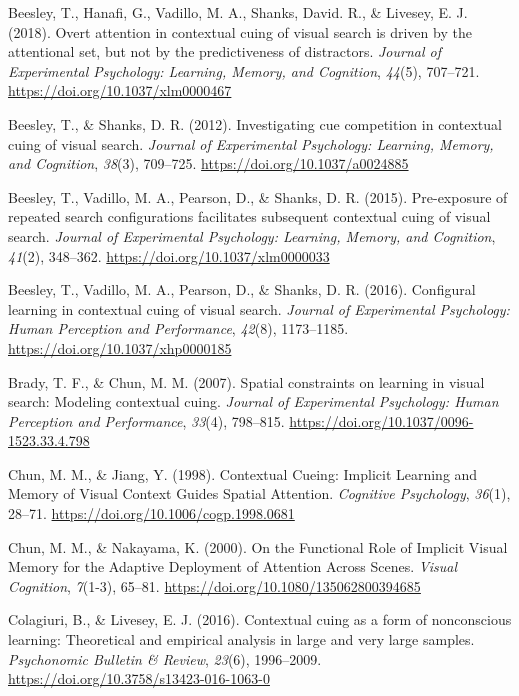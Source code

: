 \documentclass[
  man,
  floatsintext,
  longtable,
  nolmodern,
  notxfonts,
  notimes,
  colorlinks=true,linkcolor=blue,citecolor=blue,urlcolor=blue]{apa7}
\newlength{\cslhangindent}
\newenvironment{CSLReferences}[2] %
 {\begin{list}{}{%
  \setlength{\itemindent}{0pt}
  \setlength{\leftmargin}{0pt}
  \setlength{\parsep}{0pt}
  \ifodd #1
   \setlength{\leftmargin}{\cslhangindent}
   \setlength{\itemindent}{-1\cslhangindent}
  \fi
  \setlength{\itemsep}{#2\baselineskip}}}
 {\end{list}}
\begin{document}
\label{refs}
\begin{CSLReferences}{1}{0}
Beesley, T., Hanafi, G., Vadillo, M. A., Shanks, David. R., \& Livesey,
E. J. (2018). Overt attention in contextual cuing of visual search is
driven by the attentional set, but not by the predictiveness of
distractors. \emph{Journal of Experimental Psychology: Learning, Memory,
and Cognition}, \emph{44}(5), 707--721.
\url{https://doi.org/10.1037/xlm0000467}

Beesley, T., \& Shanks, D. R. (2012). Investigating cue competition in
contextual cuing of visual search. \emph{Journal of Experimental
Psychology: Learning, Memory, and Cognition}, \emph{38}(3), 709--725.
\url{https://doi.org/10.1037/a0024885}

Beesley, T., Vadillo, M. A., Pearson, D., \& Shanks, D. R. (2015).
Pre-exposure of repeated search configurations facilitates subsequent
contextual cuing of visual search. \emph{Journal of Experimental
Psychology: Learning, Memory, and Cognition}, \emph{41}(2), 348--362.
\url{https://doi.org/10.1037/xlm0000033}

Beesley, T., Vadillo, M. A., Pearson, D., \& Shanks, D. R. (2016).
Configural learning in contextual cuing of visual search. \emph{Journal
of Experimental Psychology: Human Perception and Performance},
\emph{42}(8), 1173--1185. \url{https://doi.org/10.1037/xhp0000185}

Brady, T. F., \& Chun, M. M. (2007). Spatial constraints on learning in
visual search: {Modeling} contextual cuing. \emph{Journal of
Experimental Psychology: Human Perception and Performance},
\emph{33}(4), 798--815. \url{https://doi.org/10.1037/0096-1523.33.4.798}

Chun, M. M., \& Jiang, Y. (1998). Contextual {Cueing}: {Implicit
Learning} and {Memory} of {Visual Context Guides Spatial Attention}.
\emph{Cognitive Psychology}, \emph{36}(1), 28--71.
\url{https://doi.org/10.1006/cogp.1998.0681}

Chun, M. M., \& Nakayama, K. (2000). On the {Functional Role} of
{Implicit Visual Memory} for the {Adaptive Deployment} of {Attention
Across Scenes}. \emph{Visual Cognition}, \emph{7}(1-3), 65--81.
\url{https://doi.org/10.1080/135062800394685}

Colagiuri, B., \& Livesey, E. J. (2016). Contextual cuing as a form of
nonconscious learning: {Theoretical} and empirical analysis in large and
very large samples. \emph{Psychonomic Bulletin \& Review}, \emph{23}(6),
1996--2009. \url{https://doi.org/10.3758/s13423-016-1063-0}


\end{CSLReferences}
\end{document}
